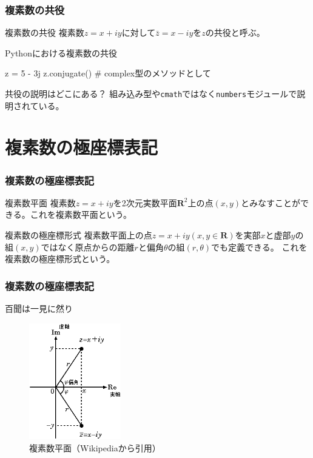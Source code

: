 \documentclass[dvipdfmx,11pt,notheorems]{beamer}
\theoremstyle{definition}
\begin{document}
\begin{frame}[fragile]\frametitle{複素数の共役}

\begin{block}{複素数の共役}
複素数$z=x + iy$に対して$\bar{z}=x -iy$を$z$の共役と呼ぶ。
\end{block}

\begin{exampleblock}{Pythonにおける複素数の共役}
\begin{pyconsole}
z = 5 - 3j
z.conjugate()  # complex型のメソッドとして
\end{pyconsole}
\end{exampleblock}

\begin{alertblock}{共役の説明はどこにある？}
組み込み型や\texttt{cmath}ではなく\texttt{numbers}モジュールで説明されている。
\end{alertblock}

\end{frame}

\section{複素数の極座標表記}

\begin{frame}\frametitle{複素数の極座標表記}

\begin{block}{複素数平面}
複素数$z=x + iy$を2次元実数平面$\mathbf{R}^{2}$上の点$(x, y)$とみなすことができる。これを複素数平面という。
\end{block}

\begin{block}{複素数の極座標形式}
複素数平面上の点$z=x+iy (x, y \in \mathbf{R})$を実部$x$と虚部$y$の組$(x, y)$ではなく原点からの距離$r$と偏角$\theta $の組$(r, \theta )$でも定義できる。
これを複素数の極座標形式という。
\end{block}

\end{frame}

\begin{frame}\frametitle{複素数の極座標表記}

\begin{block}{百聞は一見に然り}
\begin{figure}
  \centering
  \includegraphics[width=4cm]{complex_plane.png}
  \caption{複素数平面（Wikipediaから引用）}
\end{figure}
\end{block}
\end{frame}
\end{document}
